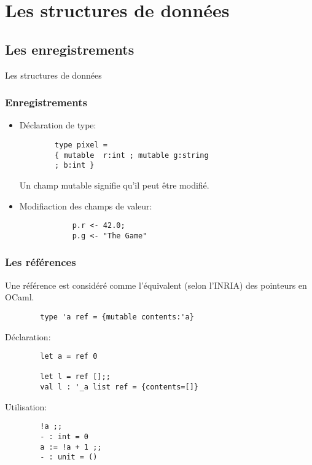 
\section{Les structures de données}
\subsection{Les enregistrements}

\begin{frame}
              Les structures de données
\end{frame}


\begin{frame}[fragile]
\frametitle{Enregistrements}
\begin{itemize}
	\item Déclaration de type: 
		\begin{lstlisting}
		type pixel = 
		{ mutable  r:int ; mutable g:string 
		; b:int } 
		\end{lstlisting}
		Un champ mutable signifie qu'il peut être modifié.
	
	\item Modifiaction des champs de valeur:
		\begin{lstlisting}
			p.r <- 42.0;
			p.g <- "The Game"
		\end{lstlisting}
\end{itemize}
\end{frame}


\begin{frame}[fragile]
\frametitle{Les références}
	Une référence est considéré comme l'équivalent (selon l'INRIA) des pointeurs en OCaml.
	\begin{lstlisting}
		type 'a ref = {mutable contents:'a}
	\end{lstlisting}
	Déclaration:
	\begin{lstlisting}
		let a = ref 0

		let l = ref [];;
		val l : '_a list ref = {contents=[]}
	\end{lstlisting}
	Utilisation:
	\begin{lstlisting}
		!a ;;
		- : int = 0
		a := !a + 1 ;;
		- : unit = ()
	\end{lstlisting}

\end{frame}

